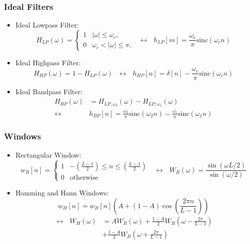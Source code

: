 \documentclass{beamer}
\begin{document}
\begin{frame}
  \frametitle{Ideal Filters}
  \begin{itemize}
  \item Ideal Lowpass Filter:
    \[
    H_{LP}(\omega)
    = \begin{cases} 1& |\omega|\le\omega_c,\\
      0 & \omega_c<|\omega|\le\pi.
    \end{cases}~~~\leftrightarrow~~~
    h_{LP}[m]=\frac{\omega_c}{\pi}\mbox{sinc}(\omega_c n)
    \]
  \item Ideal Highpass Filter:
    \[
    H_{HP}(\omega)=1-H_{LP}(\omega)~~~\leftrightarrow~~~
    h_{HP}[n]=\delta[n]-\frac{\omega_c}{\pi}\mbox{sinc}(\omega_c n)
    \]
  \item Ideal Bandpass Filter:
    \begin{align*}
      H_{BP}(\omega)&=H_{LP,\omega_2}(\omega)-H_{LP,\omega_1}(\omega)\\
      \leftrightarrow
      &h_{BP}[n]=\frac{\omega_2}{\pi}\mbox{sinc}(\omega_2 n)-\frac{\omega_1}{\pi}\mbox{sinc}(\omega_1 n)
    \end{align*}
  \end{itemize}
\end{frame}

\begin{frame}
  \frametitle{Windows}
  \begin{itemize}
  \item Rectangular Window:
    \[
    w_R[n] = \begin{cases}
      1 & -\left(\frac{L-1}{2}\right)\le n\le \left(\frac{L-1}{2}\right)\\
      0 & \mbox{otherwise}
    \end{cases}~~~\leftrightarrow~~~
    W_R(\omega)=\frac{\sin(\omega L/2)}{\sin(\omega/2)}
    \]
  \item Hamming and Hann Windows:
    \[
    w_H[n] = w_R[n]\left(A+(1-A)\cos\left(\frac{2\pi n}{L-1}\right)\right)
    \]
    \begin{align*}
    \leftrightarrow~~~
    W_H(\omega)&=AW_R(\omega)+\frac{1-A}{2}W_R\left(\omega-\frac{2\pi}{L-1}\right)\\
    &+\frac{1-A}{2}W_R\left(\omega+\frac{2\pi}{L-1}\right)
    \end{align*}
  \end{itemize}
\end{frame}
\end{document}
